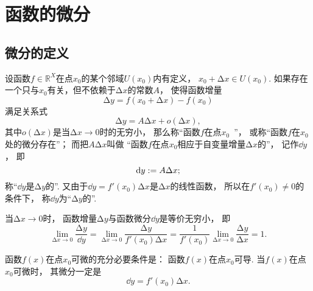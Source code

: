 \section{函数的微分}
\subsection{微分的定义}
\begin{definition}
设函数\(f\in\mathbb{R}^X\)在点\(x_0\)的某个邻域\(U(x_0)\)内有定义，
\(x_0 + \increment x \in U(x_0)\).
如果存在一个只与\(x_0\)有关，但不依赖于\(\increment x\)的常数\(A\)，
使得函数增量\begin{equation*}
	\increment y
	= f(x_0 + \increment x) - f(x_0)
\end{equation*}
满足关系式\begin{equation*}
	\increment y
	= A \increment x + o(\increment x),
\end{equation*}
其中\(o(\increment x)\)是当\(\increment x\to0\)时的无穷小，
那么称“函数\(f\)在点\(x_0\)~”，
或称“函数\(f\)在\(x_0\)处的微分存在”；
而把\(A\increment x\)叫做
“函数\(f\)在点\(x_0\)相应于自变量增量\(\increment x\)的”，
记作\(\dd{y}\)，
即\begin{equation*}
	\dd{y}
	:=
	A \Delta x;
\end{equation*}
称“\(\dd{y}\)是\(\increment y\)的”.
又由于\(\dd{y} = f'(x_0)\increment x\)是\(\increment x\)的线性函数，
所以在\(f'(x_0) \neq 0\)的条件下，
称\(\dd{y}\)为“\(\increment y\)的”.
\end{definition}

\begin{property}
当\(\increment x\to0\)时，
函数增量\(\increment y\)与函数微分\(\dd{y}\)是等价无穷小，
即\begin{equation*}
	\lim_{\increment x\to0} \frac{\increment y}{\dd{y}}
	= \lim_{\increment x\to0} \frac{\increment y}{f'(x_0) \increment x}
	= \frac{1}{f'(x_0)} \lim_{\increment x\to0} \frac{\increment y}{\increment x}
	= 1.
\end{equation*}
\end{property}

\begin{theorem}
函数\(f(x)\)在点\(x_0\)可微的充分必要条件是：
函数\(f(x)\)在点\(x_0\)可导.
当\(f(x)\)在点\(x_0\)可微时，
其微分一定是\begin{equation*}
	\dd{y}=f'(x_0)\increment x.
\end{equation*}
\end{theorem}

